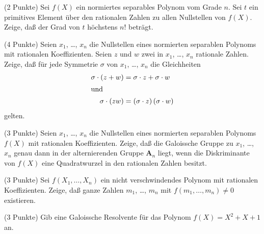 \documentclass{algsheet}
\begin{document}
\begin{exercise}(2 Punkte)\newline
    Sei \(f(X)\) ein normiertes separables Polynom vom Grade \(n\). Sei \(t\) ein primitives Element über den
    rationalen Zahlen zu allen Nullstellen von \(f(X)\). Zeige, daß der Grad von \(t\) höchstens \(n!\)
    beträgt.
\end{exercise}






\begin{exercise}(4 Punkte)\newline
    Seien \(x_1\), \dots, \(x_n\) die Nullstellen eines normierten separablen
    Polynoms mit rationalen Koeffizienten. Seien \(z\) und \(w\) zwei in
    \(x_1\), \dots, \(x_n\) rationale Zahlen. Zeige, daß für jede Symmetrie
    \(\sigma\) von \(x_1\), \dots, \(x_n\) die Gleichheiten 
    \begin{align*}
        \sigma \cdot (z + w) & = \sigma \cdot z + \sigma \cdot w\\
        \shortintertext{und}
        \sigma \cdot (z w) & = (\sigma \cdot z) \, (\sigma \cdot w)
    \end{align*}
    gelten.   
\end{exercise}




\begin{exercise}(3 Punkte)\newline
    Seien \(x_1\), \dots, \(x_n\) die Nullstellen eines normierten separablen Polynoms \(f(X)\) mit rationalen
    Koeffizienten. Zeige, daß die Galoissche Gruppe zu \(x_1\), \dots, \(x_n\) genau dann in der
    alternierenden Gruppe \(\mathbf A_n\) liegt, wenn die Diskriminante von \(f(X)\) eine Quadratwurzel in den
    rationalen Zahlen besitzt.
\end{exercise}




\begin{exercise}(3 Punkte)\newline
    Sei \(f(X_1, \dots, X_n)\) ein nicht verschwindendes Polynom mit rationalen Koeffizienten. Zeige, daß
    ganze Zahlen \(m_1\), \dots, \(m_n\) mit \(f(m_1, \dots, m_n) \neq 0\) existieren.
\end{exercise}

\begin{exercise}(3 Punkte)\newline
    Gib eine Galoissche Resolvente für das Polynom \(f(X) = X^2 + X + 1\) an.
\end{exercise}
\end{document}
